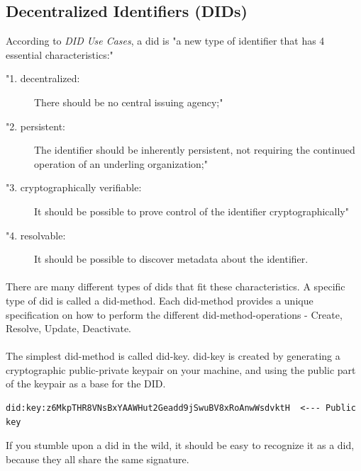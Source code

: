 \newpage




\subsection{Decentralized Identifiers (DIDs)} 

According to \textit{DID Use Cases}\cite{DIDUseCases}, a \acrshort{did} is "a new type of identifier that has 4 essential characteristics:"
\begin{description}
    \item["1. decentralized:] There should be no central issuing agency;"
    \item["2. persistent:] The identifier should be inherently persistent, not requiring the continued operation of an underling organization;"
    \item["3. cryptographically verifiable:] It should be possible to prove control of the identifier cryptographically"
    \item["4. resolvable:] It should be possible to discover metadata about the identifier.
\end{description}
    
\paragraph{}
There are many different types of \acrshort{dids} that fit these characteristics. A specific type of \acrshort{did} is called a \gls{did-method}\cite{DIDMethod}. Each \gls{did-method} provides a unique specification on how to perform the different \gls{did-method-operations}\cite{DIDMethodOperations} - Create, Resolve, Update, Deactivate. 

\paragraph{}
The simplest \gls{did-method} is called \gls{did-key}\cite{DIDKey}. \gls{did-key} is created by generating a cryptographic public-private keypair on your machine, and using the public part of the keypair as a base for the DID.

\begin{lstlisting}[caption={Example of a \gls{did-key}}]
did:key:z6MkpTHR8VNsBxYAAWHut2Geadd9jSwuBV8xRoAnwWsdvktH  <--- Public key
\end{lstlisting}

If you stumble upon a \acrshort{did} in the wild, it should be easy to recognize it as a \acrshort{did}, because they all share the same signature.

